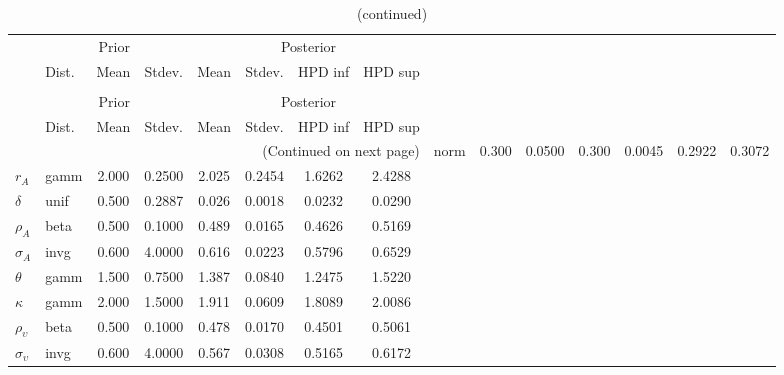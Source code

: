  
\begin{center}
\begin{longtable}{llcccccc} 
\caption{Results from Metropolis-Hastings (parameters)}
 \label{Table:MHPosterior:1}\\
\toprule 
  & \multicolumn{3}{c}{Prior}  &  \multicolumn{4}{c}{Posterior} \\
  \cmidrule(r{.75em}){2-4} \cmidrule(r{.75em}){5-8}
  & Dist. & Mean  & Stdev. & Mean & Stdev. & HPD inf & HPD sup\\
\midrule \endfirsthead 
\caption{(continued)}\\\toprule 
  & \multicolumn{3}{c}{Prior}  &  \multicolumn{4}{c}{Posterior} \\
  \cmidrule(r{.75em}){2-4} \cmidrule(r{.75em}){5-8}
  & Dist. & Mean  & Stdev. & Mean & Stdev. & HPD inf & HPD sup\\
\midrule \endhead 
\bottomrule \multicolumn{8}{r}{(Continued on next page)} \endfoot 
\bottomrule \endlastfoot 
${\alpha}$ & norm &   0.300 & 0.0500 &   0.300& 0.0045 &  0.2922 &  0.3072 \\ 
${r_{A}}$ & gamm &   2.000 & 0.2500 &   2.025& 0.2454 &  1.6262 &  2.4288 \\ 
${\delta}$ & unif &   0.500 & 0.2887 &   0.026& 0.0018 &  0.0232 &  0.0290 \\ 
${\rho_A}$ & beta &   0.500 & 0.1000 &   0.489& 0.0165 &  0.4626 &  0.5169 \\ 
${\sigma_A}$ & invg &   0.600 & 4.0000 &   0.616& 0.0223 &  0.5796 &  0.6529 \\ 
${\theta}$ & gamm &   1.500 & 0.7500 &   1.387& 0.0840 &  1.2475 &  1.5220 \\ 
${\kappa}$ & gamm &   2.000 & 1.5000 &   1.911& 0.0609 &  1.8089 &  2.0086 \\ 
${\rho_\upsilon}$ & beta &   0.500 & 0.1000 &   0.478& 0.0170 &  0.4501 &  0.5061 \\ 
${\sigma_\upsilon}$ & invg &   0.600 & 4.0000 &   0.567& 0.0308 &  0.5165 &  0.6172 \\ 
\end{longtable}
 \end{center}

